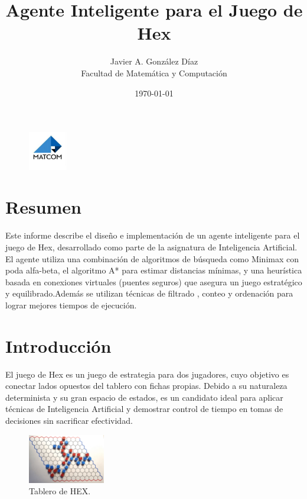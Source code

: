 \documentclass[12pt]{article}
\title{Agente Inteligente para el Juego de Hex}
\author{Javier A. González Díaz \\ Facultad de Matemática y Computación}
\date{\today}
\begin{document}
\maketitle


\begin{figure}[H]
    \centering
    \includegraphics[width=0.15\textwidth]{img/matcom.jpg}
    \label{fig:matcom}
\end{figure}

\section*{Resumen}
Este informe describe el diseño e implementación de un agente inteligente para el juego de Hex, desarrollado como parte de la asignatura de Inteligencia Artificial. El agente utiliza una combinación de algoritmos de búsqueda como Minimax con poda alfa-beta, el algoritmo A* para estimar distancias mínimas, y una heurística basada en conexiones virtuales (puentes seguros)
que asegura un juego estratégico y equilibrado.Además se utilizan técnicas de filtrado , conteo y ordenación para lograr mejores tiempos de ejecución.

\section{Introducción}
El juego de Hex es un juego de estrategia para dos jugadores, cuyo objetivo es conectar lados opuestos del tablero con fichas propias. Debido a su naturaleza determinista y su gran espacio de estados, es un candidato ideal para aplicar técnicas de Inteligencia Artificial y demostrar control de tiempo en tomas de decisiones sin sacrificar efectividad.

\begin{figure}[H]
    \centering
    \includegraphics[width=0.3\textwidth]{img/hex_board.jpg}
    \caption{Tablero de HEX.}
    \label{fig:hex_board}
\end{figure}
\end{document}
